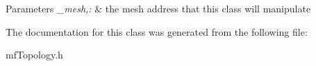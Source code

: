 \begin{DoxyParams}{Parameters}
{\em \_\-mesh,:} & the mesh address that this class will manipulate \\
\hline
\end{DoxyParams}


The documentation for this class was generated from the following file:\begin{DoxyCompactItemize}
\item 
mfTopology.h\end{DoxyCompactItemize}

